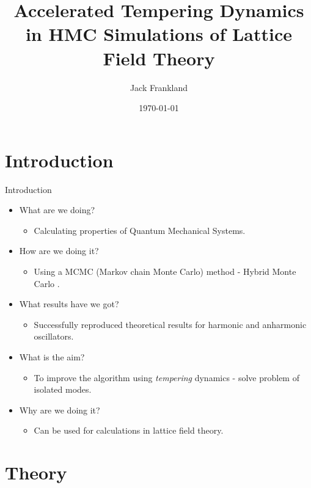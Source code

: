 \documentclass{beamer}
\title[Accelerated Tempering Dynamics in HMC Simulations of Lattice Field
Theory]{Accelerated Tempering Dynamics in HMC Simulations of Lattice Field
Theory}
\author{Jack Frankland}
\institute{University of Edinburgh}
\date{\today{}}
\begin{document}
\begin{frame}
    \titlepage
\end{frame}

\section{Introduction}

    \begin{frame}{Introduction}
        \begin{itemize}
            \item<1-> What are we  doing? 
            \begin{itemize}
                \item<1-> Calculating properties of Quantum Mechanical Systems.
            \end{itemize}
            \item<2-> How are we doing it?
            \begin{itemize}
                \item<2-> Using a MCMC (Markov chain Monte Carlo) method - Hybrid Monte Carlo \cite{duane_kennedy_pendleton_roweth_1987}.
            \end{itemize}
            \item<3-> What results have we got?
            \begin{itemize}
                \item<3-> Successfully reproduced theoretical results for harmonic and anharmonic oscillators.
            \end{itemize}
            \item<4-> What is the aim?
                \begin{itemize}
                    \item<4->To improve the algorithm using \textit{tempering} dynamics - solve problem of isolated modes.
                \end{itemize}
            \item<5-> Why are we doing it?
            \begin{itemize}
                \item<5-> Can be used for calculations in lattice field theory\cite{bietenholz_2016}.
            \end{itemize}
        \end{itemize}
    \end{frame}

\section{Theory}
\end{document}
